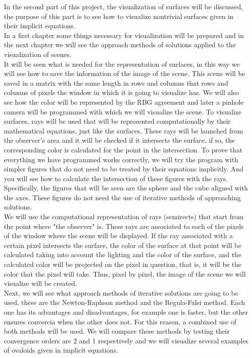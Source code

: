 In the second part of this project, the visualization of surfaces will be discussed, the purpose of this part is to see how to visualize nontrivial surfaces given in their implicit equations.
${ }$\\

In a first chapter some things necessary for visualization will be prepared and in the next chapter we will see the approach methods of solutions applied to the visualization of scenes.
${ }$\\

It will be seen what is needed for the representation of surfaces, in this way we will see how to save the information of the image of the scene. This scene will be saved in a matrix with the same length in rows and columns that rows and columns of pixels the window in which it is going to visualize has. We will also see how the color will be represented by the RBG agreement and later a pinhole camera will be programmed with which we will visualize the scene. To visualize surfaces, rays will be used that will be represented computationally by their mathematical equations, just like the surfaces. These rays will be launched from the observer's area and it will be checked if it intersects the surface, if so, the corresponding color is calculated for the point in the intersection. To prove that everything we have programmed works correctly, we will try the program with simpler figures that do not need to be treated by their equations implicitly. And you will see how to calculate the intersection of these figures with the rays. Specifically, the figures that will be seen are the sphere and the cube aligned with the axes. These figures do not need the use of iterative methods of approaching solutions.
${ }$\\

We will use the computational representation of rays (semirects) that start from the point where "the observer" is. These rays are associated to each of the pixels of the window where the scene will be displayed. If the ray associated with a certain pixel intersects the surface, the color of the surface at that point will be calculated taking into account the lighting and the color of the surface, and the calculated color will be projected on the pixel in question, that is, it will be the color that the pixel will take. Thus, pixel by pixel, the image of the scene we will visualize will be created.
${ }$\\

Next, we will see what approach methods of iterative solutions are going to be used, these are the Newton-Raphson method and the Regula-Falsi method. Each one has its advantages and disadvantages, for example one is faster, but the other ensures convercia when the other does not. For this reason, a combined use of both methods will be used. We will compare these methods by testing their convergence orders are 2 and 1 respectively and we will visualize several examples of ovaloids given in implicit equations.
${ }$\\

